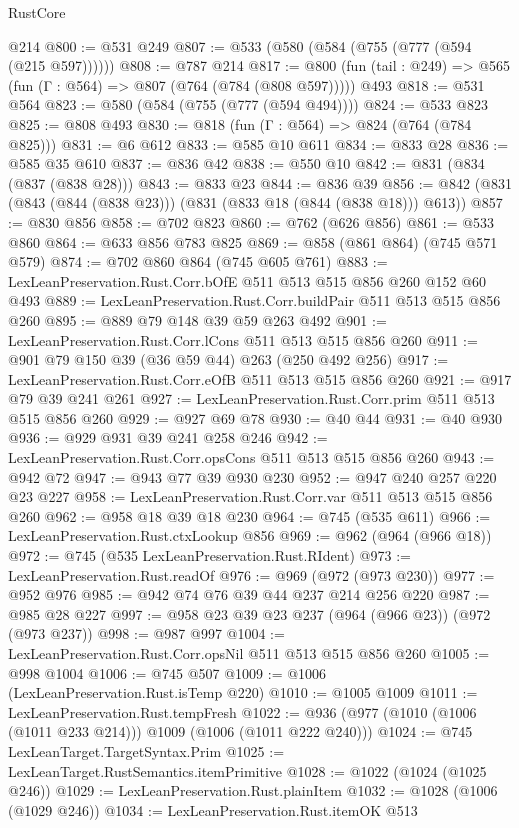 \begin{lexlean}{RustCore}
\begin{coremodule}
{\begin{coremodule}
{{{{{    @214
@800 := @531 @249
@807 := @533 (@580 (@584 (@755 (@777 (@594 (@215 @597))))))
@808 := @787 @214
@817 := @800 (fun (tail : @249) => @565 (fun (Γ : @564) => @807 (@764 (@784 (@808 @597))))) @493
@818 := @531 @564
@823 := @580 (@584 (@755 (@777 (@594 @494))))
@824 := @533 @823
@825 := @808 @493
@830 := @818 (fun (Γ : @564) => @824 (@764 (@784 @825)))
@831 := @6 @612
@833 := @585 @10 @611
@834 := @833 @28
@836 := @585 @35 @610
@837 := @836 @42
@838 := @550 @10
@842 := @831 (@834 (@837 (@838 @28)))
@843 := @833 @23
@844 := @836 @39
@856 := @842 (@831 (@843 (@844 (@838 @23))) (@831 (@833 @18 (@844 (@838 @18))) @613))
@857 := @830 @856
@858 := @702 @823
@860 := @762 (@626 @856)
@861 := @533 @860
@864 := @633 @856 @783 @825
@869 := @858 (@861 @864) (@745 @571 @579)
@874 := @702 @860 @864 (@745 @605 @761)
@883 := LexLeanPreservation.Rust.Corr.bOfE @511 @513 @515 @856 @260 @152 @60 @493
@889 := LexLeanPreservation.Rust.Corr.buildPair @511 @513 @515 @856 @260
@895 := @889 @79 @148 @39 @59 @263 @492
@901 := LexLeanPreservation.Rust.Corr.lCons @511 @513 @515 @856 @260
@911 := @901 @79 @150 @39 (@36 @59 @44) @263 (@250 @492 @256)
@917 := LexLeanPreservation.Rust.Corr.eOfB @511 @513 @515 @856 @260
@921 := @917 @79 @39 @241 @261
@927 := LexLeanPreservation.Rust.Corr.prim @511 @513 @515 @856 @260
@929 := @927 @69 @78
@930 := @40 @44
@931 := @40 @930
@936 := @929 @931 @39 @241 @258 @246
@942 := LexLeanPreservation.Rust.Corr.opsCons @511 @513 @515 @856 @260
@943 := @942 @72
@947 := @943 @77 @39 @930 @230
@952 := @947 @240 @257 @220 @23 @227
@958 := LexLeanPreservation.Rust.Corr.var @511 @513 @515 @856 @260
@962 := @958 @18 @39 @18 @230
@964 := @745 (@535 @611)
@966 := LexLeanPreservation.Rust.ctxLookup @856
@969 := @962 (@964 (@966 @18))
@972 := @745 (@535 LexLeanPreservation.Rust.RIdent)
@973 := LexLeanPreservation.Rust.readOf
@976 := @969 (@972 (@973 @230))
@977 := @952 @976
@985 := @942 @74 @76 @39 @44 @237 @214 @256 @220
@987 := @985 @28 @227
@997 := @958 @23 @39 @23 @237 (@964 (@966 @23)) (@972 (@973 @237))
@998 := @987 @997
@1004 := LexLeanPreservation.Rust.Corr.opsNil @511 @513 @515 @856 @260
@1005 := @998 @1004
@1006 := @745 @507
@1009 := @1006 (LexLeanPreservation.Rust.isTemp @220)
@1010 := @1005 @1009
@1011 := LexLeanPreservation.Rust.tempFresh
@1022 := @936 (@977 (@1010 (@1006 (@1011 @233 @214))) @1009 (@1006 (@1011 @222 @240)))
@1024 := @745 LexLeanTarget.TargetSyntax.Prim
@1025 := LexLeanTarget.RustSemantics.itemPrimitive
@1028 := @1022 (@1024 (@1025 @246))
@1029 := LexLeanPreservation.Rust.plainItem
@1032 := @1028 (@1006 (@1029 @246))
@1034 := LexLeanPreservation.Rust.itemOK @513
}}}}}
\end{coremodule}}
\end{coremodule}
\end{lexlean}
